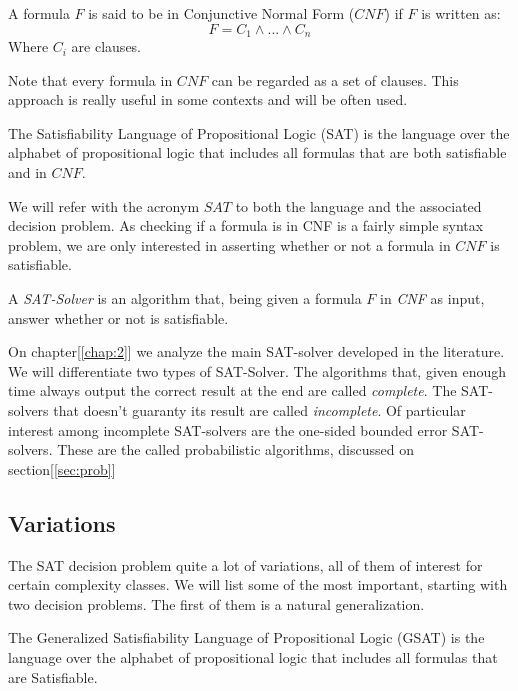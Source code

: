 \begin{definition}
  A formula $F$ is said to be in Conjunctive Normal Form ($CNF$) if $F$ is written as:
  $$F = C_1\wedge ... \wedge C_n$$
  Where $C_i$  are clauses.
\end{definition}

Note that every formula in $CNF$ can be regarded as a set of clauses. This approach is really useful in some contexts and will be often used.

\begin{definition}
  The Satisfiability Language of Propositional Logic (SAT) is the language over the alphabet of propositional logic that includes all formulas that are both satisfiable and in $CNF$.
\end{definition}

We will refer with the acronym $SAT$ to both the language and the associated decision problem. As checking if a formula is in CNF is a fairly simple syntax problem, we are only interested in asserting whether or not a formula in $CNF$ is satisfiable.

\begin{definition}
  A \emph{SAT-Solver} is an algorithm that, being given a formula $F$ in \emph{CNF} as input, answer whether or not is satisfiable.
\end{definition}

On chapter[\ref{chap:2}] we analyze the main SAT-solver developed in the literature. We will differentiate two types of SAT-Solver. The algorithms that, given enough time always output the correct result at the end are called \emph{complete}. The SAT-solvers that doesn't guaranty its result are called \emph{incomplete}. Of particular interest among incomplete SAT-solvers are the one-sided bounded error SAT-solvers. These are the called probabilistic algorithms, discussed on section[\ref{sec:prob}]


\subsection{Variations}

The SAT decision problem quite a lot of variations, all of them of interest for certain complexity classes. We will list some of the most important, starting with two decision problems. The first of them is a natural generalization.

\begin{definition}
  The Generalized Satisfiability Language of Propositional Logic (GSAT) is the language over the alphabet of propositional logic that includes all formulas that are Satisfiable.
\end{definition}

